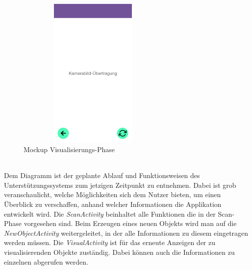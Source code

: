 \begin{figure}[hbt!]
    \centering
    \includegraphics[width=7.5cm,height=7.5cm,keepaspectratio]{3Konzeption/Bilder/Visual-Phase_AugmIS.png}
    \caption{Mockup Visualisierungs-Phase}
    \label{pic:Mocksvisual}
\end{figure}
\\
Dem Diagramm ist der geplante Ablauf und Funktionsweisen des Unterstützungssystems zum jetzigen Zeitpunkt zu entnehmen. Dabei ist grob 
veranschaulicht, welche Möglichkeiten sich dem Nutzer bieten, um einen Überblick zu verschaffen, anhand welcher Informationen die 
Applikation entwickelt wird. Die \textit{ScanActivity} beinhaltet alle Funktionen die in der Scan-Phase vorgesehen sind. Beim Erzeugen eines neuen Objekts 
wird man auf die \textit{NewObjectActivity} weitergeleitet, in der alle Informationen zu diesem eingetragen werden müssen. Die \textit{VisualActivity} ist für das 
erneute Anzeigen der zu visualisierenden Objekte zuständig. Dabei können auch die Informationen zu einzelnen abgerufen werden. 
